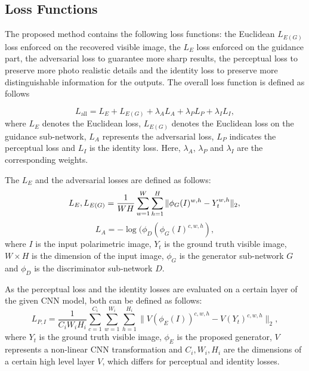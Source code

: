 \documentclass[10pt,twocolumn,letterpaper]{article}
\begin{document}
\subsection{Loss Functions} 
The proposed method contains the following loss functions: the Euclidean $L_{E(G)}$ loss  enforced on the recovered visible image, the $L_E$ loss enforced on the guidance part,  the adversarial loss to guarantee more sharp results, the perceptual loss to preserve more photo realistic details and the identity loss to preserve more distinguishable information for the outputs. The overall loss function is defined as follows

\begin{equation}
\label{eq:overall_loss}
L_{\text{all}} = L_{E} + L_{E(G)}+ \lambda_A L_{A} + \lambda_PL_{P} +\lambda_IL_{I} ,
\end{equation}
where $L_{E}$ denotes the Euclidean  loss, $L_{E(G)}$ denotes the Euclidean  loss on the guidance sub-network, $L_A$ represents the adversarial loss, $L_P$ indicates the perceptual loss and $L_I$ is the identity loss. Here, $\lambda_A$, $\lambda_P$ and $\lambda_I$ are the corresponding weights. 

The $L_E$ and the adversarial losses are defined as follows:
\begin{equation}
\label{eq:trans_loss_euc}
 L_{E}, L_{E(G)}= \frac{1}{WH}\sum_{w=1}^{W}\sum_{h=1}^{H} \|\phi_{G}({I})^{w,h}-Y_t^{w,h}\|_2,	\\
 \end{equation} 
 \begin{equation}
 \label{eq:trans_loss_adv}
   L_A= -\log(\phi_D(\phi_G({I})^{c,w,h}),
 \end{equation}
 where $I$ is the input polarimetric image, $Y_t$ is the ground truth visible image, $W\times H$ is the dimension of the input image, $\phi_{G}$ is the generator sub-network $G$ and $\phi_D$ is the discriminator sub-network $D$.

As the perceptual loss and the identity losses are evaluated on a certain layer of the given CNN model, both can be defined as follows:  
\begin{equation}
\label{eq:dehaze_loss_perc}
 L_{P,I}= \frac{1}{C_iW_iH_i}\sum_{c=1}^{C_i}\sum_{w=1}^{W_i}\sum_{h=1}^{H_i} \|V(\phi_E({I}))^{c,w,h}-V
 (Y_t)^{c,w,h}\|_2,
\end{equation}
 where $Y_t$ is the ground truth visible image, $\phi_{E}$ is the proposed generator, $V$ represents a non-linear CNN transformation and $C_i,W_i,H_i$ are the dimensions of a certain high level layer $V$, which differs for perceptual and identity losses.   
 
\end{document}
